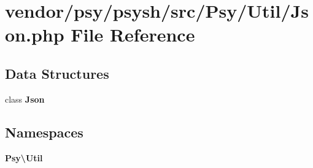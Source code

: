 \section{vendor/psy/psysh/src/\+Psy/\+Util/\+Json.php File Reference}
\label{psy_2psysh_2src_2_psy_2_util_2_j_s_o_n_8php}
\subsection*{Data Structures}
\begin{DoxyCompactItemize}
\item 
class {\bf Json}
\end{DoxyCompactItemize}
\subsection*{Namespaces}
\begin{DoxyCompactItemize}
\item 
 {\bf Psy\textbackslash{}\+Util}
\end{DoxyCompactItemize}
